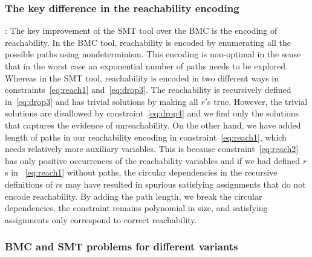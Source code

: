 
\subsubsection{The key difference in the reachability encoding}:
The key improvement of the SMT tool over the BMC is the
encoding of reachability.
%
In the BMC tool, reachability is encoded by enumerating all the possible paths using nondeterminism.
%
This encoding is non-optimal in the sense that in the worst case an exponential number of paths needs to be explored.
%
Whereas in the SMT tool, reachability is encoded in two different
ways in constraints~\eqref{eq:reach1} and~\eqref{eq:drop3}.
%
The reachability is recursively defined in~\eqref{eq:drop3} and has
trivial solutions by making all $r'$s true.
%
However, the trivial solutions are disallowed by constraint~\eqref{eq:drop4} and we find
only the solutions that captures the evidence of unreachability.
%
On the other hand,
we have added length of paths in our reachability encoding in constraint~\eqref{eq:reach1},
which needs relatively more auxiliary variables.
%
This is because constraint~\eqref{eq:reach2} has only positive
occurrences of the reachability variables and if we had defined
$r$s in ~\eqref{eq:reach1} without paths,
the circular dependencies in the recursive definitions of $r$s
may have resulted in spurious satisfying assignments that
do not encode reachability.
%
By adding the path length, we break the circular dependencies, the
constraint remains polynomial in size, and satisfying assignments only
correspond to correct reachability.



\subsubsection{BMC and SMT problems for different variants}

